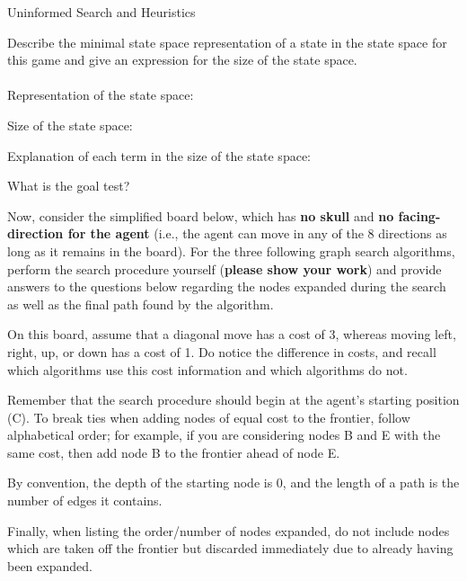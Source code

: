 \begin{problem}{Uninformed Search and Heuristics}
\begin{question}
\begin{subquestion}[7]
Describe the minimal state space representation of a state in the state space for this game and give an expression for the size of the state space.\\\\

Representation of the state space:

Size of the state space: 

Explanation of each term in the size of the state space: 

 
\end{subquestion}

\vspace{0.4in}

\newpage
\begin{subquestion}[3]
What is the goal test?


\end{subquestion}
\end{question}

\newpage

\begin{question}
Now, consider the simplified board below, which has \textbf{no skull} and \textbf{no facing-direction for the agent} (i.e., the agent can move in any of the 8 directions as long as it remains in the board). For the three following graph search algorithms, perform the search procedure yourself (\textbf{please show your work}) and provide answers to the questions below regarding the nodes expanded during the search as well as the final path found by the algorithm.

On this board, assume that a diagonal move has a cost of 3, whereas moving left, right, up, or down has a cost of 1. Do notice the difference in costs, and recall which algorithms use this cost information and which algorithms do not.

Remember that the search procedure should begin at the agent's starting position (C). To break ties when adding nodes of equal cost to the frontier, follow alphabetical order; for example, if you are considering nodes B and E with the same cost, then add node B to the frontier ahead of node E.

By convention, the depth of the starting node is 0, and the length of a path is the number of edges it contains.

Finally, when listing the order/number of nodes expanded, do not include nodes which are taken off the frontier but discarded immediately due to already having been expanded.


\end{question}
\end{problem}

